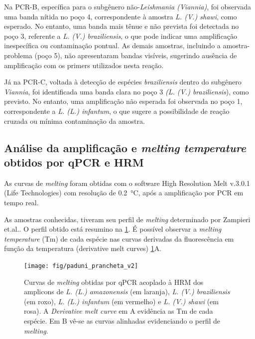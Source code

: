 
Na PCR-B, específica para o subgênero não-\textit{Leishmania (Viannia)}, foi observada uma banda nítida no poço 4, correspondente à amostra \textit{L. (V.) shawi}, como esperado. 
No entanto, uma banda mais tênue e não prevista foi detectada no poço 3, referente a \textit{L. (V.) braziliensis}, o que pode indicar uma amplificação inespecífica ou contaminação 
pontual. As demais amostras, incluindo a amostra-problema (poço 5), não apresentaram bandas visíveis, sugerindo ausência de amplificação com os primers utilizados nesta reação.

Já na PCR-C, voltada à detecção de espécies \textit{braziliensis} dentro do
subgênero \textit{Viannia}, foi identificada uma banda clara no poço 3 \textit{(L. (V.) braziliensis}), 
como previsto. No entanto, uma amplificação não esperada foi observada no poço 1, correspondente a \textit{L. (L.) infantum}, o que sugere a possibilidade de reação cruzada ou mínima 
contaminação da amostra.

\subsection{Análise da amplificação e \textit{melting temperature} obtidos por
qPCR e HRM}

As curvas de \textit{melting} foram obtidas com o software High
Resolution Melt v.3.0.1 (Life Technologies) com resolução de
\qty{0,2}{\celsius}, após a amplificação por PCR em tempo real.

As amostras conhecidas, tiveram seu perfil de \textit{melting} determinado por
Zampieri et.al.\cite{HRMzampi2016}. O perfil obtido está resumino na
\cref{paduni}.  É possível observar a \textit{melting temperature} (Tm) de cada
espécie nas curvas derivadas da fluorescência em função da temperatura
(derivative melt curves) \cref{paduni}A.

\begin{figure}[h]
        \centering
        \texttt{[image: fig/paduni\_prancheta\_v2]}
        \caption{Curvas de \textit{melting} obtidas por qPCR acoplado à HRM dos amplicons de \textit{L. (L.)
        amazonensis} (em laranja), \textit{L. (V.) braziliensis} (em roxo),
    \textit{L. (L.) infantum} (em vermelho) e \textit{L. (V.) shawi} (em rosa).
A \textit{Derivative melt curve} em A evidência as Tm de cada espécie. Em B
vê-se as curvas alinhadas evidenciando o perfil de \textit{melting}.}
        \label{paduni}
\end{figure} 

